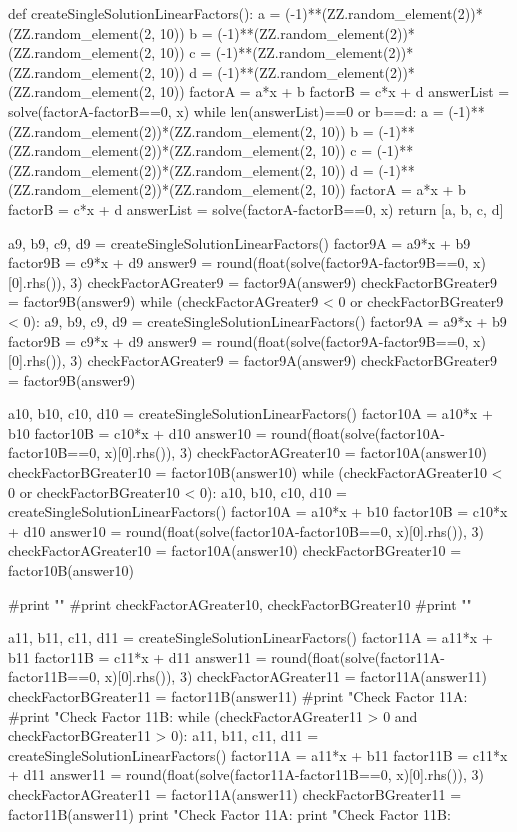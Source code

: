 \documentclass{ximera}
\begin{document}
\begin{sagesilent}
def createSingleSolutionLinearFactors(): 
    a = (-1)**(ZZ.random_element(2))*(ZZ.random_element(2, 10))
    b = (-1)**(ZZ.random_element(2))*(ZZ.random_element(2, 10))
    c = (-1)**(ZZ.random_element(2))*(ZZ.random_element(2, 10))
    d = (-1)**(ZZ.random_element(2))*(ZZ.random_element(2, 10))
    factorA = a*x + b
    factorB = c*x + d
    answerList = solve(factorA-factorB==0, x)
    while len(answerList)==0 or b==d:
        a = (-1)**(ZZ.random_element(2))*(ZZ.random_element(2, 10))
        b = (-1)**(ZZ.random_element(2))*(ZZ.random_element(2, 10))
        c = (-1)**(ZZ.random_element(2))*(ZZ.random_element(2, 10))
        d = (-1)**(ZZ.random_element(2))*(ZZ.random_element(2, 10))
        factorA = a*x + b
        factorB = c*x + d
        answerList = solve(factorA-factorB==0, x)
    return [a, b, c, d]

a9, b9, c9, d9 = createSingleSolutionLinearFactors()
factor9A = a9*x + b9
factor9B = c9*x + d9
answer9 = round(float(solve(factor9A-factor9B==0, x)[0].rhs()), 3)
checkFactorAGreater9 = factor9A(answer9)
checkFactorBGreater9 = factor9B(answer9)
while (checkFactorAGreater9 < 0 or checkFactorBGreater9 < 0):
    a9, b9, c9, d9 = createSingleSolutionLinearFactors()
    factor9A = a9*x + b9
    factor9B = c9*x + d9
    answer9 = round(float(solve(factor9A-factor9B==0, x)[0].rhs()), 3)
    checkFactorAGreater9 = factor9A(answer9)
    checkFactorBGreater9 = factor9B(answer9)

a10, b10, c10, d10 = createSingleSolutionLinearFactors()
factor10A = a10*x + b10
factor10B = c10*x + d10
answer10 = round(float(solve(factor10A-factor10B==0, x)[0].rhs()), 3)
checkFactorAGreater10 = factor10A(answer10)
checkFactorBGreater10 = factor10B(answer10)
while (checkFactorAGreater10 < 0 or checkFactorBGreater10 < 0):
    a10, b10, c10, d10 = createSingleSolutionLinearFactors()
    factor10A = a10*x + b10
    factor10B = c10*x + d10
    answer10 = round(float(solve(factor10A-factor10B==0, x)[0].rhs()), 3)
    checkFactorAGreater10 = factor10A(answer10)
    checkFactorBGreater10 = factor10B(answer10)

#print ""
#print checkFactorAGreater10, checkFactorBGreater10
#print ""

a11, b11, c11, d11 = createSingleSolutionLinearFactors()
factor11A = a11*x + b11
factor11B = c11*x + d11
answer11 = round(float(solve(factor11A-factor11B==0, x)[0].rhs()), 3)
checkFactorAGreater11 = factor11A(answer11)
checkFactorBGreater11 = factor11B(answer11)
#print "Check Factor 11A: %
#print "Check Factor 11B: %
while (checkFactorAGreater11 > 0 and checkFactorBGreater11 > 0):
    a11, b11, c11, d11 = createSingleSolutionLinearFactors()
    factor11A = a11*x + b11
    factor11B = c11*x + d11
    answer11 = round(float(solve(factor11A-factor11B==0, x)[0].rhs()), 3)
    checkFactorAGreater11 = factor11A(answer11)
    checkFactorBGreater11 = factor11B(answer11)
    print "\n Check Factor 11A: %
    print "Check Factor 11B: %


\end{sagesilent}
\end{document}
